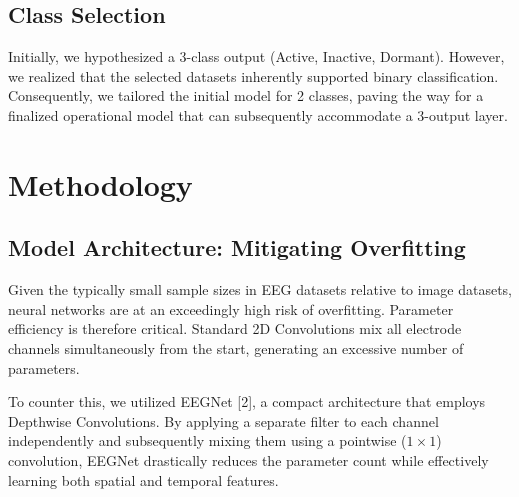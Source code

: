 \documentclass[10pt,a4paper,openright]{report}
\begin{document}
\section{Class Selection}
Initially, we hypothesized a 3-class output (Active, Inactive, Dormant). However, we realized that the selected datasets inherently supported binary classification. Consequently, we tailored the initial model for 2 classes, paving the way for a finalized operational model that can subsequently accommodate a 3-output layer.

\chapter{Methodology}

\section{Model Architecture: Mitigating Overfitting}
Given the typically small sample sizes in EEG datasets relative to image datasets, neural networks are at an exceedingly high risk of overfitting. Parameter efficiency is therefore critical. Standard 2D Convolutions mix all electrode channels simultaneously from the start, generating an excessive number of parameters.

To counter this, we utilized EEGNet [2], a compact architecture that employs Depthwise Convolutions. By applying a separate filter to each channel independently and subsequently mixing them using a pointwise ($1 \times 1$) convolution, EEGNet drastically reduces the parameter count while effectively learning both spatial and temporal features.
\end{document}
